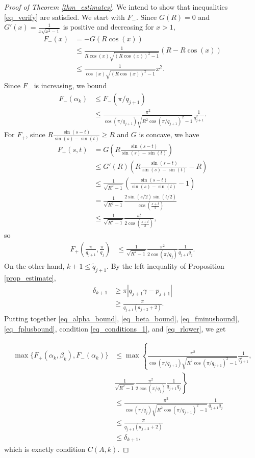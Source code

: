 \documentclass{amsart}
\begin{document}
\begin{proof}[Proof of Theorem \ref{thm_estimates}]
		We intend to show that inequalities \eqref{eq_verify} are satisfied.
		We start with $F_-$. Since $G(R)=0$ and $G'(x) = \frac 1 {x\sqrt{x^2-1}}$ is positive and decreasing for $x>1$,
		\begin{align}
			F_-(x)
			&= -G(R \cos(x)) \\
			&\leq \frac 1{R \cos(x) \sqrt{(R \cos(x))^2 - 1}} (R - R \cos(x) ) \\
			&\leq \frac 1{\cos(x) \sqrt{(R \cos(x))^2 - 1}} x^2.
		\end{align}
		Since $F_-$ is increasing, we bound
		\begin{align}
			F_-(\alpha_k)
			&\leq F_-(\pi/q_{j+1}) \\
			&\leq \frac {\pi^2}{\cos(\pi/q_{j+1}) \sqrt{R^2 \cos(\pi/q_{j+1})^2-1}} \frac 1{q_{j+1}^2}. \label{eq_fminusbound}
		\end{align}
		For $F_+$, since $R \frac{\sin(s - t)}{\sin(s) - \sin(t)} \geq R$ and $G$ is concave, we have
		\begin{align}
                        F_+(s,t)
			&=G \left( R \frac{\sin(s - t)}{\sin(s) - \sin(t)} \right) \\
			&\leq G'(R) \left(R \frac{\sin(s - t)}{\sin(s) - \sin(t)} - R \right) \\
			&\leq \frac 1 {\sqrt{R^2-1}} \left( \frac{\sin(s - t)}{\sin(s) - \sin(t)} - 1 \right) \\
			&= \frac 1 {\sqrt{R^2-1}} \frac{2 \sin(s/2) \sin(t/2)}{\cos(\frac {s+t}2)} \\
			&\leq \frac 1 {\sqrt{R^2-1}} \frac{s t}{2 \cos(\frac {s+t}2)},
		\end{align}
		so
		\begin{align}
			F_+(\frac \pi{q_{j+1}}, \frac \pi {q_j})
			&\leq \frac 1 {\sqrt{R^2-1}} \frac {\pi^2} {2 \cos(\pi / q_j)} \frac 1{q_{j+1} q_j} \label{eq_fplusbound}.
		\end{align}
		On the other hand, $k+1 \leq \tilde q_{j+1}$. By the left inequality of Proposition \ref{prop_estimate},
		\begin{align}
			\delta_{k+1}
			&\geq \pi |q_{j+1} \gamma - p_{j+1}| \\
			&\geq \frac \pi {q_{j+1} (a_{j+2} + 2)} \label{eq_rlower}.
		\end{align}
		Putting together \eqref{eq_alpha_bound}, \eqref{eq_beta_bound}, \eqref{eq_fminusbound}, \eqref{eq_fplusbound}, condition \eqref{eq_conditions_1}, and \eqref{eq_rlower}, we get 

		\begin{align}
			\max\{F_{+}(\alpha_{k}, \beta_{k}), F_{-}(\alpha_{k}) \}
			&\leq \max \left\{ \frac {\pi^2}{\cos(\pi/q_{j+1}) \sqrt{R^2 \cos(\pi/q_{j+1})^2-1}} \frac 1{q_{j+1}^2},\right.\\ &\left. \frac 1 {\sqrt{R^2-1}} \frac {\pi^2} {2 \cos(\pi / q_j)} \frac 1{q_{j+1} q_j} \right\} \\
			& \leq  \frac {\pi^2}{\cos(\pi/q_j) \sqrt{R^2 \cos(\pi/q_{j+1})^2-1}} \frac 1{q_{j+1} q_j} \\
			& \leq \frac \pi {q_{j+1} (a_{j+2} + 2)} \\
			& \leq \delta_{k+1},
		\end{align}
		which is exactly condition $C(A,k)$.


\end{proof}
\end{document}
